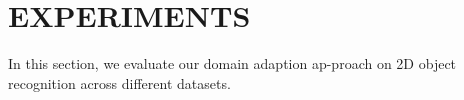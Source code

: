 \documentclass{article}
\begin{document}
%
%
%
%





\section{EXPERIMENTS}
\label{sec:3}

In this section, we evaluate our domain adaption ap-proach on 2D object recognition across different datasets.
\end{document}
